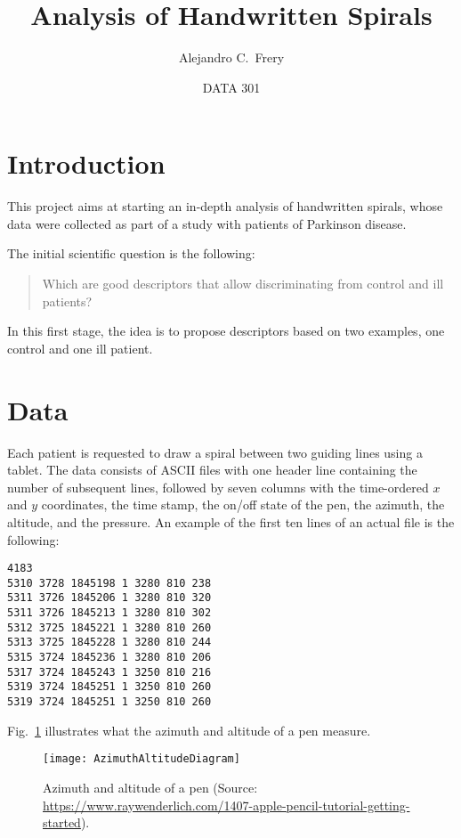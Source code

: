 \documentclass[11pt]{article}
\title{Analysis of Handwritten Spirals}
\author{Alejandro C.\ Frery}
\date{DATA 301}
\begin{document}
\maketitle

\section{Introduction}

This project aims at starting an in-depth analysis of handwritten spirals, whose data were collected as part of a study with patients of Parkinson disease.

The initial scientific question is the following:
\begin{quote}
Which are good descriptors that allow discriminating from control and ill patients?
\end{quote}

In this first stage, the idea is to propose descriptors based on two examples, one control and one ill patient.

\section{Data}

Each patient is requested to draw a spiral between two guiding lines using a tablet.
The data consists of ASCII files with one header line containing the number of subsequent lines, followed by seven columns with the time-ordered
$x$ and $y$ coordinates,
the time stamp,
the on/off state of the pen,
the azimuth,
the altitude, 
and the pressure.
An example of the first ten lines of an actual file is the following:
\begin{verbatim}
4183
5310 3728 1845198 1 3280 810 238
5311 3726 1845206 1 3280 810 320
5311 3726 1845213 1 3280 810 302
5312 3725 1845221 1 3280 810 260
5313 3725 1845228 1 3280 810 244
5315 3724 1845236 1 3280 810 206
5317 3724 1845243 1 3250 810 216
5319 3724 1845251 1 3250 810 260
5319 3724 1845251 1 3250 810 260
\end{verbatim}

Fig.~\ref{Fig:AzimuthAltitude} illustrates what the azimuth and altitude of a pen measure.

\begin{figure}[hbt]
\centering
\texttt{[image: AzimuthAltitudeDiagram]}
\caption{Azimuth and altitude of a pen (Source: \protect\url{https://www.raywenderlich.com/1407-apple-pencil-tutorial-getting-started}).}
\label{Fig:AzimuthAltitude}
\end{figure}
\end{document}

